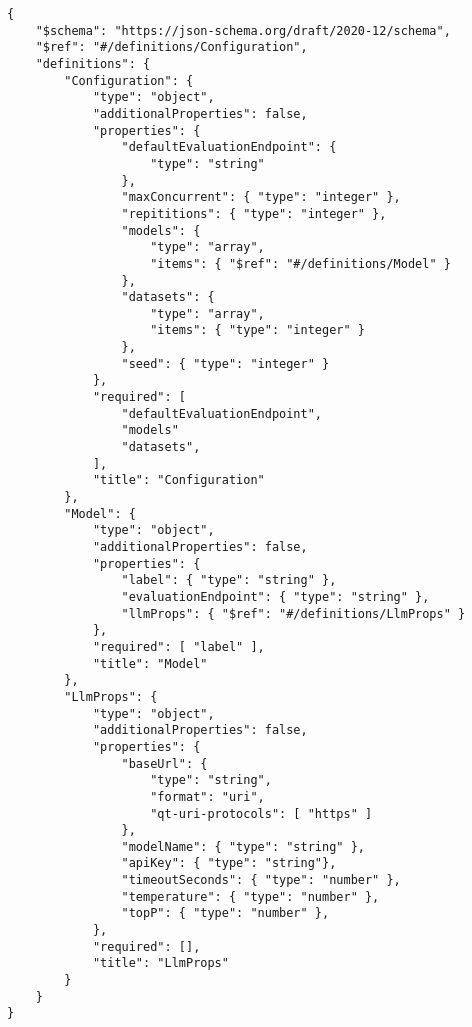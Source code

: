 \begin{lstlisting}[caption={Schema der YAML-Evaluationskonfiguration},label={lst:evaluation-config-schema}]
{
    "$schema": "https://json-schema.org/draft/2020-12/schema",
    "$ref": "#/definitions/Configuration",
    "definitions": {
        "Configuration": {
            "type": "object",
            "additionalProperties": false,
            "properties": {
                "defaultEvaluationEndpoint": {
                    "type": "string"
                },
                "maxConcurrent": { "type": "integer" },
                "repititions": { "type": "integer" },
                "models": {
                    "type": "array",
                    "items": { "$ref": "#/definitions/Model" }
                },
                "datasets": {
                    "type": "array",
                    "items": { "type": "integer" }
                },
                "seed": { "type": "integer" }
            },
            "required": [
                "defaultEvaluationEndpoint",
                "models"
                "datasets",
            ],
            "title": "Configuration"
        },
        "Model": {
            "type": "object",
            "additionalProperties": false,
            "properties": {
                "label": { "type": "string" },
                "evaluationEndpoint": { "type": "string" },
                "llmProps": { "$ref": "#/definitions/LlmProps" }
            },
            "required": [ "label" ],
            "title": "Model"
        },
        "LlmProps": {
            "type": "object",
            "additionalProperties": false,
            "properties": {
                "baseUrl": {
                    "type": "string",
                    "format": "uri",
                    "qt-uri-protocols": [ "https" ]
                },
                "modelName": { "type": "string" },
                "apiKey": { "type": "string"},
                "timeoutSeconds": { "type": "number" },
                "temperature": { "type": "number" },
                "topP": { "type": "number" },
            },
            "required": [],
            "title": "LlmProps"
        }
    }
}
\end{lstlisting}

